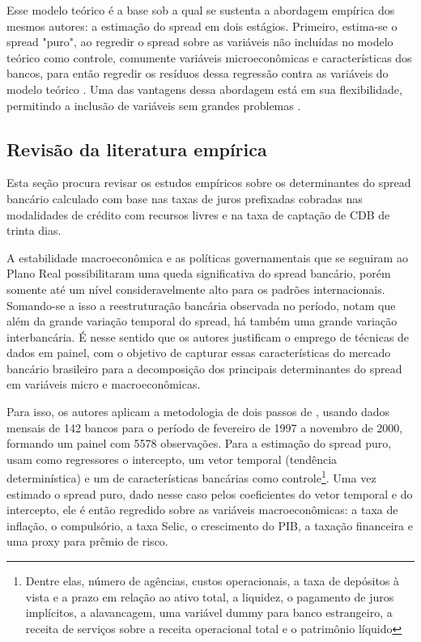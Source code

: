 \documentclass[a4paper,
               article,
               12pt,
               openany,
               oneside,
               english,
               brazil]{abntex2}
\numberwithin{equation}{section}
\begin{document}
    Esse modelo teórico é a base sob a qual se sustenta a abordagem empírica dos mesmos autores: a estimação do spread em dois estágios. Primeiro, estima-se o spread "puro", ao regredir o spread sobre as variáveis não incluídas no modelo teórico como controle, comumente variáveis microeconômicas e características dos bancos, para então regredir os resíduos dessa regressão contra as variáveis do modelo teórico \textcite{maudos}. Uma das vantagens dessa abordagem está em sua flexibilidade, permitindo a inclusão de variáveis sem grandes problemas \textcite[p.~2]{almeida15}.

\subsection{Revisão da literatura empírica}

    Esta seção procura revisar os estudos empíricos sobre os determinantes do spread bancário calculado com base nas taxas de juros prefixadas cobradas nas modalidades de crédito com recursos livres e na taxa de captação de CDB de trinta dias.

    A estabilidade macroeconômica e as políticas governamentais que se seguiram ao Plano Real possibilitaram uma queda significativa do spread bancário, porém somente até um nível consideravelmente alto para os padrões internacionais. Somando-se a isso a reestruturação bancária observada no período, \textcite{afanasieff02} notam que além da grande variação temporal do spread, há também uma grande variação interbancária. É nesse sentido que os autores justificam o emprego de técnicas de dados em painel, com o objetivo de capturar essas características do mercado bancário brasileiro para a decomposição dos principais determinantes do spread em variáveis micro e macroeconômicas.

    Para isso, os autores aplicam a metodologia de dois passos de \textcite{hoesaunders}, usando dados mensais de 142 bancos para o período de fevereiro de 1997 a novembro de 2000, formando um painel com 5578 observações. Para a estimação do spread puro, usam como regressores o intercepto, um vetor temporal (tendência determinística) e um de características bancárias como controle\footnote{Dentre elas, número de agências, custos operacionais, a taxa de depósitos à vista e a prazo em relação ao ativo total, a liquidez, o pagamento de juros implícitos, a alavancagem, uma variável dummy para banco estrangeiro, a receita de serviços sobre a receita operacional total e o patrimônio líquido}. Uma vez estimado o spread puro, dado nesse caso pelos coeficientes do vetor temporal e do intercepto, ele é então regredido sobre as variáveis macroeconômicas: a taxa de inflação, o compulsório, a taxa Selic, o crescimento do PIB, a taxação financeira e uma proxy para prêmio de risco.
\end{document}
